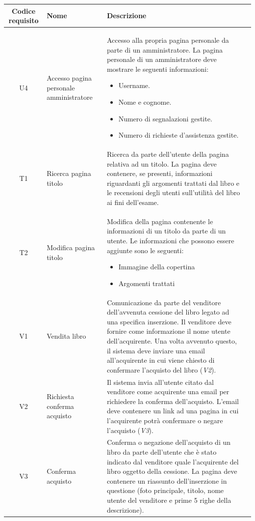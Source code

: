 \documentclass[10pt,a4paper]{report}
\begin{document}
	\newpage
	
	\begin{tabular}{cp{3cm}p{9cm}p{1cm}}
		Codice requisito&Nome&Descrizione\\ \hline
		U4&Accesso pagina personale amministratore&Accesso alla propria pagina personale da parte di un amministratore. La pagina personale di un amministratore deve mostrare le seguenti informazioni:
		\begin{itemize}
			\item Username.
			\item Nome e cognome.
			\item Numero di segnalazioni gestite.
			\item Numero di richieste d'assistenza gestite.
		\end{itemize}\\ \hline
		T1&Ricerca pagina titolo&Ricerca da parte dell'utente della pagina relativa ad un titolo. La pagina deve contenere, se presenti, informazioni riguardanti gli argomenti trattati dal libro e le recensioni degli utenti sull'utilità del libro ai fini dell'esame.\\ \hline
		T2&Modifica pagina titolo&Modifica della pagina contenente le informazioni di un titolo da parte di un utente. Le informazioni che possono essere aggiunte sono le seguenti:
		\begin{itemize}
			\item Immagine della copertina
			\item Argomenti trattati
		\end{itemize}\\ \hline
		V1&Vendita libro&Comunicazione da parte del venditore dell'avvenuta cessione del libro legato ad una specifica inserzione. Il venditore deve fornire come informazione il nome utente dell'acquirente. Una volta avvenuto questo, il sistema deve inviare una email all'acquirente in cui viene chiesto di confermare l'acquisto del libro (\textit{V2}).\\ \hline
		V2&Richiesta conferma acquisto&Il sistema invia all'utente citato dal venditore come acquirente una email per richiedere la conferma dell'acquisto. L'email deve contenere un link ad una pagina in cui l'acquirente potrà confermare o negare l'acquisto (\textit{V3}).\\ \hline
		V3&Conferma acquisto&Conferma o negazione dell'acquisto di un libro da parte dell'utente che è stato indicato dal venditore quale l'acquirente del libro oggetto della cessione. La pagina deve contenere un riassunto dell'inserzione in questione (foto principale, titolo, nome utente del venditore e prime 5 righe della descrizione).

\end{tabular}
\end{document}
